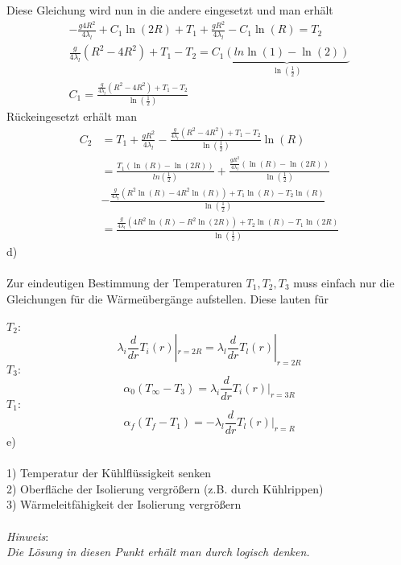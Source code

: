 Diese Gleichung wird nun in die andere eingesetzt und man erhält
\begin{align*}
	-\frac{g4R^2}{4\lambda_l} + C_1 \ln\left(2R\right) + T_1 + \frac{gR^2}{4\lambda_l} - C_1\ln\left(R\right) = T_2 \\
	\frac{g}{4\lambda_l}\left(R^2 - 4R^2\right) 
	+ T_1 - T_2 = C_1 \underbrace{\left( ln\ln\left(1\right) - \ln\left(2\right)\right)}_{\ln\left( \frac{1}{2}\right)} \\
	C_1 = \frac{\frac{g}{4\lambda_l}\left(R^2 - 4R^2\right) + T_1 - T_2}{\ln\left( \frac{1}{2}\right)}
\end{align*}
Rückeingesetzt erhält man
\begin{align*}
	C_2 &= T_1 + \frac{gR^2}{4\lambda_l} - \frac{\frac{g}{4\lambda_l}\left(R^2 - 4R^2\right) + T_1 - T_2}{\ln\left( \frac{1}{2}\right)}\ln\left(R\right) \\
	&= \frac{T_1\left(\ln\left(R\right) - \ln\left(2R\right)\right)}{ln\left(\frac{1}{2}\right)} + 
	\frac{\frac{gR^2}{4\lambda_l}\left(\ln\left(R\right) - \ln\left(2R\right)\right)}{\ln\left( \frac{1}{2}\right)} \\
	&- \frac{\frac{g}{4\lambda_l}\left(R^2\ln\left(R\right) - 4R^2\ln\left(R\right)\right) + T_1\ln\left(R\right) - T_2\ln\left(R\right)}{\ln\left( \frac{1}{2}\right)} \\
	&= \frac{\frac{g}{4\lambda_l}\left(4R^2\ln\left(R\right) - R^2\ln\left(2R\right)\right) + T_2\ln\left(R\right) - T_1\ln\left(2R\right)}{\ln\left(\frac{1}{2}\right)}
\end{align*}
d) \\ \\
Zur eindeutigen Bestimmung der Temperaturen \(T_1 , T_2 , T_3\) muss einfach nur die Gleichungen für die Wärmeübergänge aufstellen. Diese lauten für \\ \\
\(T_2:\)
\[
	\lambda_i\frac{d}{dr}T_i\left(r\right)|_{r = 2R} = \lambda_l \frac{d}{dr}T_l\left(r\right)|_{r = 2R}
\]
\(T_3:\)
\[
	\alpha_0\left(T_\infty - T_3\right) = \lambda_i\frac{d}{dr}T_i\left(r\right)|_{r = 3R}
\]
\(T_1:\)
\[
	\alpha_f\left(T_f - T_1\right) = -\lambda_l\frac{d}{dr}T_l\left(r\right)|_{r = R}
\]
\newpage
\noindent
e) \\ \\
1) Temperatur der Kühlflüssigkeit senken \\
2) Oberfläche der Isolierung vergrößern (z.B. durch Kühlrippen) \\
3) Wärmeleitfähigkeit der Isolierung vergrößern \\
\\
\textit{Hinweis}:\\
\textit{Die Lösung in diesen Punkt erhält man durch logisch denken.}
